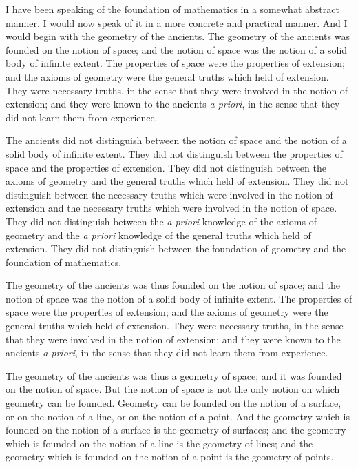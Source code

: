 \documentclass[11pt,a4paper]{article}
\begin{document}
I have been speaking of the foundation of mathematics in a somewhat
abstract manner. I would now speak of it in a more concrete and
practical manner. And I would begin with the geometry of the ancients.
The geometry of the ancients was founded on the notion of space; and
the notion of space was the notion of a solid body of infinite extent.
The properties of space were the properties of extension; and the axioms
of geometry were the general truths which held of extension. They were
necessary truths, in the sense that they were involved in the notion of
extension; and they were known to the ancients \textit{a priori}, in the
sense that they did not learn them from experience.

The ancients did not distinguish between the notion of space and the
notion of a solid body of infinite extent. They did not distinguish
between the properties of space and the properties of extension. They
did not distinguish between the axioms of geometry and the general
truths which held of extension. They did not distinguish between the
necessary truths which were involved in the notion of extension and the
necessary truths which were involved in the notion of space. They did
not distinguish between the \textit{a priori} knowledge of the axioms of
geometry and the \textit{a priori} knowledge of the general truths which
held of extension. They did not distinguish between the foundation of
geometry and the foundation of mathematics.

The geometry of the ancients was thus founded on the notion of space;
and the notion of space was the notion of a solid body of infinite
extent. The properties of space were the properties of extension; and
the axioms of geometry were the general truths which held of extension.
They were necessary truths, in the sense that they were involved in the
notion of extension; and they were known to the ancients \textit{a
priori}, in the sense that they did not learn them from experience.

The geometry of the ancients was thus a geometry of space; and it was
founded on the notion of space. But the notion of space is not the
only notion on which geometry can be founded. Geometry can be founded
on the notion of a surface, or on the notion of a line, or on the notion
of a point. And the geometry which is founded on the notion of a
surface is the geometry of surfaces; and the geometry which is founded
on the notion of a line is the geometry of lines; and the geometry
which is founded on the notion of a point is the geometry of points.
\end{document}
